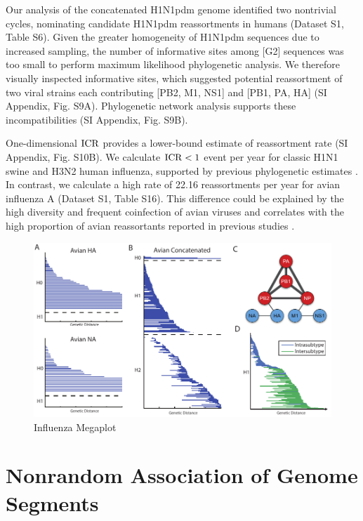 Our analysis of the concatenated H1N1pdm genome identified two nontrivial cycles, nominating candidate H1N1pdm reassortments in humans (Dataset S1, Table S6).
Given the greater homogeneity of H1N1pdm sequences due to increased sampling, the number of informative sites among [G2] sequences was too small to perform maximum likelihood phylogenetic analysis.
We therefore visually inspected informative sites, which suggested potential reassortment of two viral strains each contributing [PB2, M1, NS1] and [PB1, PA, HA] (SI Appendix, Fig. S9A).
Phylogenetic network analysis supports these incompatibilities (SI Appendix, Fig. S9B).

One-dimensional $\operatorname{ICR}$ provides a lower-bound estimate of reassortment rate (SI Appendix, Fig. S10B).
We calculate $\operatorname{ICR} < 1$ event per year for classic H1N1 swine and H3N2 human influenza, supported by previous phylogenetic estimates \cite{Lycett:2012fqa,Holmes:2005cia}.
In contrast, we calculate a high rate of 22.16 reassortments per year for avian influenza A (Dataset S1, Table S16).
This difference could be explained by the high diversity and frequent coinfection of avian viruses \cite{Lubeck:1979ws} and correlates with the high proportion of avian reassortants reported in previous studies \cite{Dugan:2008iba}.

\begin{figure}
\begin{center}
\centerline{\includegraphics[width=\columnwidth]{./fig/influenza/influenza_Fig3.pdf}}
\caption[Influenza Megaplot]{Influenza Megaplot}
\label{fig:flu:megaplot}
\end{center}
\end{figure}

\section{Nonrandom Association of Genome Segments}
\label{flu:nonrandom_reassortment}

